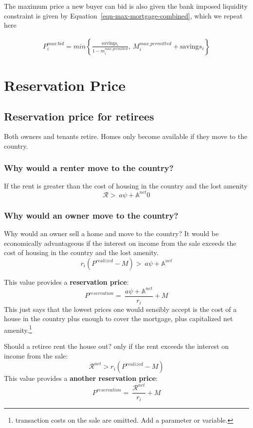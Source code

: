 {The maximum price a new buyer can bid is also given the bank imposed liquidity constraint is given by Equation~\ref{eqn-max-mortgage-combined}, which we repeat here


\begin{align}
P_i^{max\ bid}= min \left\{\frac{\mathrm{savings}_i}{1-m_i^{max\_permitted}},\  M_i^{max\_permitted} + \mathrm{saving}s_i  \right\}   \nonumber  
\end{align}


\section{Reservation Price}



\subsection{Reservation price for retirees}
Both owners and tenants retire. Homes only become available if they move to the country. 



\subsubsection{Why would a renter move to the country?} 
If the rent is greater than the cost of housing in the country and the lost amenity
\[\mathcal{R} > \ a\psi+ \mathbb{A}^{net}0\]

\subsubsection{Why would an owner move to the country?}
Why would an owner sell a home and move to the country? It would be economically advantageous if the interest on income from the sale exceeds the cost of housing in the country and the lost amenity.
\[r_i(P^{realized}-M) >\ a\psi+ \mathbb{A}^{net}\label{eq:movers-gainA}\]

This value provides a \textbf{reservation price}: 
\[P^{reservation} =\ \frac{a\psi+ \mathbb{A}^{net}}{r_i}+M \label{eq:movers-gainB}\]
This just says that the lowest prices one would sensibly accept is the cost of a house in the country plus enough to cover the mortgage, plus capitalized net amenity.\footnote{transaction costs on the sale are omitted. Add a parameter or variable.}

Should a retiree rent the house out? only if the rent exceeds the  interest on income from the sale:
\[\mathcal{R}^{net}>r_i(P^{realized}-M)\]
This value provides a \textbf{another reservation price}: 
\[P^{reservation} =\ \frac{\mathcal{R}^{net}}{r_i}+M \label{eq:movers-gainC}\]


}
